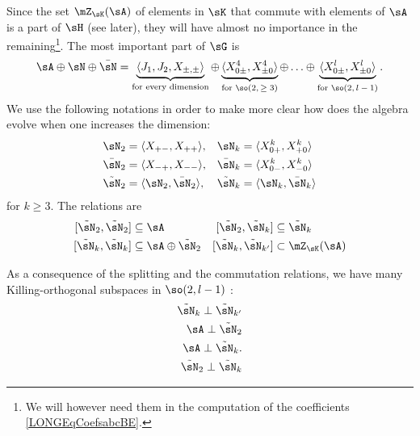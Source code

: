 Since the set $\mZ_{\sK}(\sA)$ of elements in $\sK$ that commute with elements of $\sA$ is a part of $\sH$ (see later), they will have almost no importance in the remaining\footnote{We will however need them in the computation of the coefficients \eqref{LONGEqCoefsabcBE}.}. The most important part of $\sG$ is
\begin{equation}		\label{LONGEqDecomDimQlipm}
	\sA\oplus\sN\oplus\bar\sN=\underbrace{\langle J_1,J_2,X_{\pm,\pm}\rangle}_{\text{for every dimension}}\oplus\underbrace{\langle X_{0\pm}^{4},X_{\pm 0}^{4}\rangle}_{\text{for $\so(2,\geq 3)$}}\oplus\ldots\oplus\underbrace{\langle X_{0\pm}^l,X_{\pm 0}^{l}\rangle}_{\text{for $\so(2, l-1)$}}.
\end{equation}
We use the following notations in order to make more clear how does the algebra evolve when one increases the dimension:
\begin{equation}
	\begin{aligned}[]
		\sN_2&=\langle X_{+-},X_{++}\rangle,		&\sN_k&=\langle X^k_{0+},X_{+0}^k\rangle	\\
		\bar\sN_2&=\langle X_{-+},X_{--} \rangle, 	&\bar\sN_k&=\langle X_{0-}^k,X_{-0}^k\rangle\\
		\tilde\sN_2&=\langle \sN_2,\bar\sN_2\rangle,	&\tilde\sN_k&=\langle \sN_k,\bar\sN_k\rangle
	\end{aligned}
\end{equation}
for $k\geq 3$. The relations are
\begin{equation}		\label{LONGEqsCommWithtsNDeuxkA}
	\begin{aligned}[]
		[\tilde\sN_2,\tilde\sN_2]&\subseteq\sA
		&[\tilde\sN_2,\tilde\sN_k]&\subseteq\tilde\sN_k\\
		[\tilde\sN_k,\tilde\sN_{k}]&\subseteq\sA\oplus\tilde\sN_2
		&[\tilde\sN_k,\tilde\sN_{k'}]&\subset \mZ_{\sK}(\sA) \\
	\end{aligned}
\end{equation}

As a consequence of the splitting and the commutation relations, we have many Killing-orthogonal subspaces in $\so(2,l-1)$ :
\begin{subequations}
	\begin{align}
		\tilde\sN_k\perp\tilde\sN_{k'}		\label{LONGEqtsnkperprtsnkp}	\\
		\sA\perp\tilde\sN_2			\label{LONGEqAperpNTrois}		\\
		\sA\perp\tilde\sN_k.	\label{LONGEqAperpNk}				\\
		\tilde\sN_2\perp\tilde\sN_k	\label{LONGEqNTtroisperpNk}
	\end{align}
\end{subequations}

